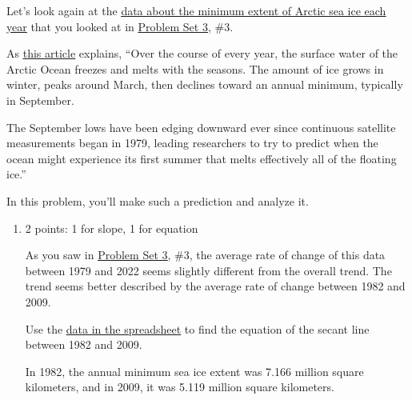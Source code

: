 \documentclass{article}
\makeatletter
\let\@href=\href
\renewcommand{\href}[2]{\@href{#1}{\ul{#2}}}
\makeatother
\begin{document}
\begin{enumerate}
  Let's look again at the \href{https://docs.google.com/spreadsheets/d/1Dx8q2itdxCfEfRMkhUi4188zXYFqXQ2MB1_svnefxyg/edit?usp=sharing}{data about the minimum extent of Arctic sea ice each year} that you looked at in \href{https://canvas.harvard.edu/files/20663280/download?download_frd=1}{Problem Set 3}, {{\#3}}.

  As \href{https://www.nytimes.com/2023/06/06/climate/arctic-sea-ice-melting.html?unlocked_article_code=1.HU4.c_XS.kUPtWv2pzsvT&smid=url-share}{this article} explains, ``Over the course of every year, the surface water of the Arctic Ocean freezes and melts with the seasons. The amount of ice grows in winter, peaks around March, then declines toward an annual minimum, typically in September.

  The September lows have been edging downward ever since continuous satellite measurements began in 1979, leading researchers to try to predict when the ocean might experience its first summer that melts effectively all of the floating ice.''

  In this problem, you'll make such a prediction and analyze it.

  \begin{enumerate}
  \item

    \begin{grading}
      2 points: 1 for slope, 1 for equation
    \end{grading}

    \begin{problem}[\vfill]
      As you saw in \href{https://canvas.harvard.edu/files/20663280/download?download_frd=1}{Problem Set 3}, {{\#3}}, the average rate of change of this data between 1979 and 2022 seems slightly different from the overall trend. The trend seems better described by the average rate of change between 1982 and 2009.

      Use the \href{https://docs.google.com/spreadsheets/d/1Dx8q2itdxCfEfRMkhUi4188zXYFqXQ2MB1_svnefxyg/edit?usp=sharing}{data in the spreadsheet} to find the equation of the secant line between 1982 and 2009.
    \end{problem}

    \begin{solution}
      In 1982, the annual minimum sea ice extent was 7.166 million square kilometers, and in 2009, it was 5.119 million
      square kilometers.


\end{solution}
\end{enumerate}
\end{enumerate}
\end{document}

